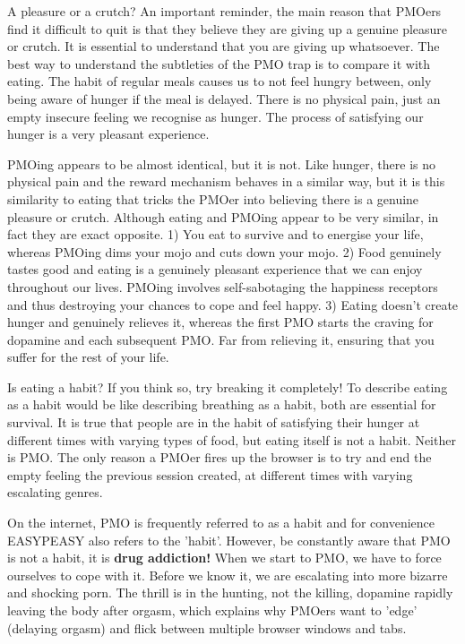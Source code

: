 A pleasure or a crutch?
An important reminder, the main reason that PMOers find it difficult to quit is that they believe they are giving up a genuine pleasure or crutch. It is essential to understand that you are giving up  whatsoever. The best way to understand the subtleties of the PMO trap is to compare it with eating. The habit of regular meals causes us to not feel hungry between, only being aware of hunger if the meal is delayed. There is no physical pain, just an empty insecure feeling we recognise as hunger. The process of satisfying our hunger is a very pleasant experience.

PMOing appears to be almost identical, but it is not. Like hunger, there is no physical pain and the reward mechanism behaves in a similar way, but it is this similarity to eating that tricks the PMOer into believing there is a genuine pleasure or crutch. Although eating and PMOing appear to be very similar, in fact they are exact opposite.
  1) You eat to survive and to energise your life, whereas PMOing dims your mojo and cuts down your mojo.
  2) Food genuinely tastes good and eating is a genuinely pleasant experience that we can enjoy throughout our lives. PMOing involves self-sabotaging the happiness receptors and thus destroying your chances to cope and feel happy.
  3) Eating doesn't create hunger and genuinely relieves it, whereas the first PMO starts the craving for dopamine and each subsequent PMO. Far from relieving it, ensuring that you suffer for the rest of your life.

Is eating a habit? If you think so, try breaking it completely! To describe eating as a habit would be like describing breathing as a habit, both are essential for survival. It is true that people are in the habit of satisfying their hunger at different times with varying types of food, but eating itself is not a habit. Neither is PMO. The only reason a PMOer fires up the browser is to try and end the empty feeling the previous session created, at different times with varying escalating genres.

On the internet, PMO is frequently referred to as a habit and for convenience EASYPEASY also refers to the 'habit'. However, be constantly aware that PMO is not a habit, it is \textbf{drug addiction!} When we start to PMO, we have to force ourselves to cope with it. Before we know it, we are escalating into more bizarre and shocking porn. The thrill is in the hunting, not the killing, dopamine rapidly leaving the body after orgasm, which explains why PMOers want to 'edge' (delaying orgasm) and flick between multiple browser windows and tabs.

